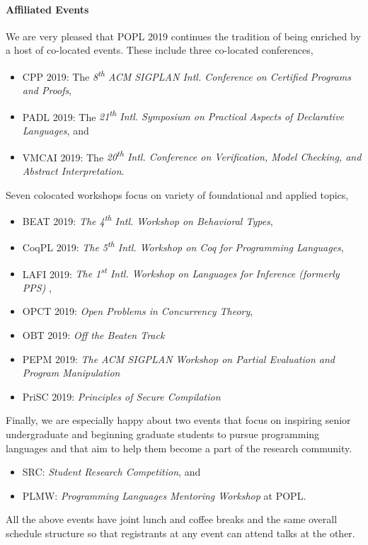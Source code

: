 \paragraph{Affiliated Events}
%
We are very pleased that POPL 2019 continues the tradition of being enriched
by a host of co-located events.
%
These include three co-located conferences,
%
\begin{itemize}
  \item CPP 2019:   The \emph{8\textsuperscript{th} ACM SIGPLAN Intl. Conference on Certified Programs and Proofs},
  \item PADL 2019:  The \emph{21\textsuperscript{th} Intl. Symposium on Practical Aspects of Declarative Languages}, and
  \item VMCAI 2019: The \emph{20\textsuperscript{th} Intl. Conference on Verification, Model Checking, and Abstract Interpretation}.
\end{itemize}
%
Seven colocated workshops focus on variety of foundational and applied topics,
%
\begin{itemize}
  \item BEAT 2019: \emph{The 4\textsuperscript{th} Intl. Workshop on Behavioral Types},
  \item CoqPL 2019: \emph{The 5\textsuperscript{th} Intl. Workshop on Coq for Programming Languages},
  \item LAFI 2019: \emph{The 1\textsuperscript{st} Intl. Workshop on Languages for Inference (formerly PPS) },
  \item OPCT 2019:   \emph{Open Problems in Concurrency Theory},
  \item OBT 2019:   \emph{Off the Beaten Track}
  \item PEPM 2019:  \emph{The ACM SIGPLAN Workshop on Partial Evaluation and Program Manipulation}
  \item PriSC 2019: \emph{Principles of Secure Compilation}
\end{itemize}
%
Finally, we are especially happy about two events that
focus on inspiring senior undergraduate and beginning
graduate students to pursue programming languages and
that aim to help them become a part of the research
community.
%
\begin{itemize}
\item SRC: \emph{Student Research Competition}, and
\item PLMW: \emph{Programming Languages Mentoring Workshop} at POPL.
\end{itemize}
%
All the above events have joint lunch and coffee breaks
and the same overall schedule structure so that registrants
at any event can attend talks at the other.

